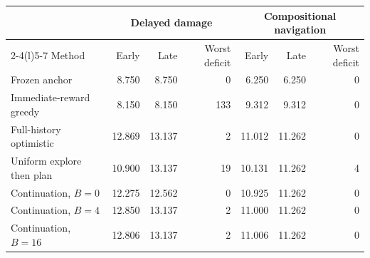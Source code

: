 \begin{tabular}{@{}lrrrrrr@{}}
\toprule
& \multicolumn{3}{c}{Delayed damage} & \multicolumn{3}{c}{Compositional navigation} \\
\cmidrule(lr){2-4}\cmidrule(l){5-7}
Method & Early & Late & Worst deficit & Early & Late & Worst deficit \\
\midrule
Frozen anchor & 8.750 & 8.750 & 0 & 6.250 & 6.250 & 0 \\
Immediate-reward greedy & 8.150 & 8.150 & 133 & 9.312 & 9.312 & 0 \\
Full-history optimistic & 12.869 & 13.137 & 2 & 11.012 & 11.262 & 0 \\
Uniform explore then plan & 10.900 & 13.137 & 19 & 10.131 & 11.262 & 4 \\
Continuation, $B=0$ & 12.275 & 12.562 & 0 & 10.925 & 11.262 & 0 \\
Continuation, $B=4$ & 12.850 & 13.137 & 2 & 11.000 & 11.262 & 0 \\
Continuation, $B=16$ & 12.806 & 13.137 & 2 & 11.006 & 11.262 & 0 \\
\bottomrule
\end{tabular}
